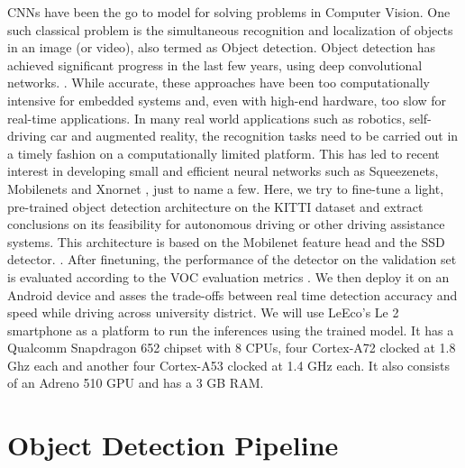 \documentclass{article}
\begin{document}
CNNs have been the go to model for solving problems in Computer Vision. One such classical problem is the simultaneous recognition and localization of objects in an image (or video), also termed as Object detection. Object detection has achieved significant progress in the last few years, using deep convolutional networks. \cite{huang2017speed}. While accurate, these approaches have been too computationally intensive for embedded systems and, even with high-end hardware, too slow for real-time applications. In many real world applications such as robotics, self-driving car and augmented reality, the recognition tasks need to be carried out in a timely fashion on a computationally limited platform. This has led to recent interest in developing small and efficient neural networks such as Squeezenets, Mobilenets and Xnornet \cite{howard2017mobilenets,iandola2016squeezenet,rastegari2016xnor}, just to name a few. Here, we try to fine-tune a light, pre-trained object detection architecture on the KITTI \cite{geiger2012we} dataset and extract conclusions on its feasibility for autonomous driving or other driving assistance systems. This architecture is based on the Mobilenet feature head and the SSD detector. \cite{howard2017mobilenets,liu2016ssd}. After finetuning, the performance of the detector on the validation set is evaluated according to the VOC evaluation metrics \cite{everingham2010pascal}. We then deploy it on an Android device and asses the trade-offs between real time detection accuracy and speed while driving across university district. 
We will use LeEco's Le 2 smartphone as a platform to run the inferences using the trained model. It has a Qualcomm Snapdragon 652 chipset with 8 CPUs, four Cortex-A72 clocked at 1.8 Ghz each and another four Cortex-A53 clocked at 1.4 GHz each. It also consists of an Adreno 510 GPU and has a 3 GB RAM.

\section{Object Detection Pipeline}
\end{document}
